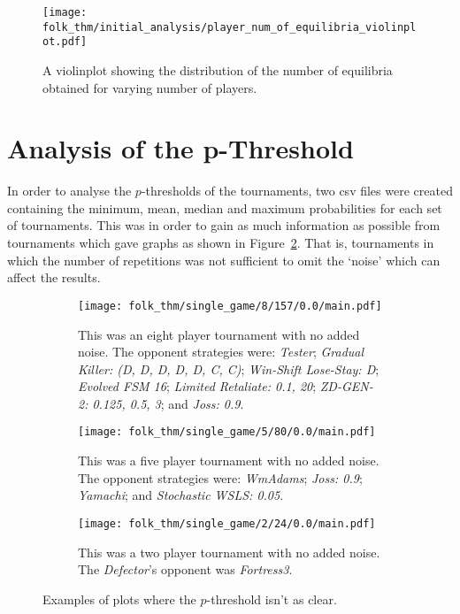 \begin{figure}      
    \centering
    \texttt{[image: folk\_thm/initial\_analysis/player\_num\_of\_equilibria\_violinplot.pdf]}
    \caption{A violinplot showing the distribution of the number of equilibria obtained for varying number of players.}\label{fig:NE_violinplot}
\end{figure}



\section{Analysis of the p-Threshold}\label{sec:Analysis_of_the_p-Threshold}
In order to analyse the \(p\)-thresholds of the tournaments, two csv files were
created containing the minimum, mean, median and maximum probabilities for each
set of tournaments. This was in order to gain as much information as possible
from tournaments which gave graphs as shown in Figure~\ref{fig:less_clear}. That
is, tournaments in which the number of repetitions was not sufficient to omit
the `noise' which can affect the results.

\begin{figure}
    \centering
    \begin{subfigure}[0.3\textwidth]
        \centering
        \texttt{[image: folk\_thm/single\_game/8/157/0.0/main.pdf]}
        \caption{This was an eight player tournament with no added noise. The opponent strategies were: \textit{Tester}; \textit{Gradual Killer: (D, D, D, D, D, C, C)}; \textit{Win-Shift Lose-Stay: D}; \textit{Evolved FSM 16}; \textit{Limited Retaliate: 0.1, 20}; \textit{ZD-GEN-2: 0.125, 0.5, 3}; and \textit{Joss: 0.9}.}
    \end{subfigure}
    \begin{subfigure}[0.3\textwidth]
        \centering
        \texttt{[image: folk\_thm/single\_game/5/80/0.0/main.pdf]}
        \caption{This was a five player tournament with no added noise. The opponent strategies were: \textit{WmAdams}; \textit{Joss: 0.9}; \textit{Yamachi}; and \textit{Stochastic WSLS: 0.05}.}
    \end{subfigure}
    \begin{subfigure}[0.3\textwidth]
        \centering
        \texttt{[image: folk\_thm/single\_game/2/24/0.0/main.pdf]}
        \caption{This was a two player tournament with no added noise. The \textit{Defector}'s opponent was \textit{Fortress3}.}
    \end{subfigure}
    \caption{Examples of plots where the \(p\)-threshold isn't as clear.}\label{fig:less_clear}
\end{figure}

